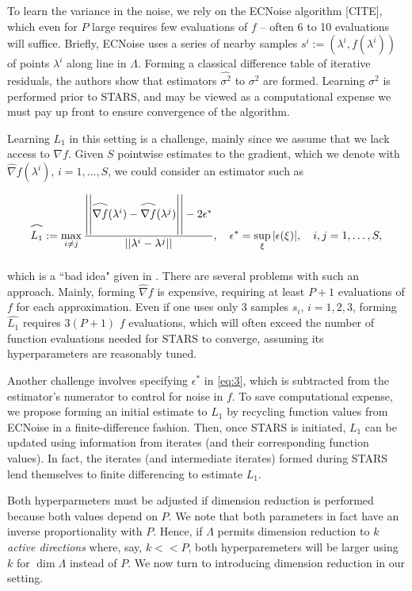 \documentclass{amsart}
\newcommand\reallywidehat[1]{\arraycolsep=0pt\relax%
\begin{array}{c}
\stretchto{
  \scaleto{
    \scalerel*[\widthof{\ensuremath{#1}}]{\kern-.5pt\bigwedge\kern-.5pt}
    {\rule[-\textheight/2]{1ex}{\textheight}} %
  }{\textheight} %
}{0.5ex}\\           %
#1\\                 %
\rule{-1ex}{0ex}
\end{array}
}
\begin{document}
To learn the variance in the noise, we rely on the ECNoise algorithm [CITE], which even for $P$ large requires few evaluations of $f$ -- often 6 to 10 evaluations will suffice. Briefly, ECNoise uses a series of nearby samples $s^i:=(\lambda^i,f(\lambda^i))$ of points $\lambda^i$ along line in $\Lambda$. Forming a classical difference table of iterative residuals, the authors show that estimators $\hat{\sigma^2}$ to $\sigma^2$ are formed. Learning $\sigma^2$ is performed prior to STARS, and may be viewed as a computational expense we must pay up front to ensure convergence of the algorithm.

Learning $L_1$ in this setting is a challenge, mainly since we assume that we lack access to $\nabla f$. Given $S$ pointwise estimates to the gradient, which we denote with $\hat{\nabla}f(\lambda^i)$, $i=1,\ldots, S$, we could consider an estimator such as



\begin{equation} \label{eq:3}
\reallywidehat{L_1}:= \max_{i \neq j} \frac{\left|\left|\reallywidehat{\nabla f}(\lambda^{i})-\reallywidehat{\nabla f}(\lambda^{j})\right|\right|-2\epsilon^*}{||\lambda^{i}-\lambda^{j}||}, \quad \epsilon^*=\sup_\xi |\epsilon(\xi)|, \quad i,j=1,\ldots, S,
\end{equation} 

\noindent which is a ``bad idea" given in \cite{Calliess}. There are several problems with such an approach. Mainly, forming $\hat{\nabla} f$ is expensive, requiring at least $P+1$ evaluations of $f$ for each approximation. Even if one uses only 3 samples $s_i$, $i=1,2,3$, forming $\hat{L_1}$ requires $3(P+1)$ $f$ evaluations, which will often exceed the number of function evaluations needed for STARS to converge, assuming its hyperparameters are reasonably tuned.

Another challenge involves specifying $\epsilon^*$ in \eqref{eq:3}, which is subtracted from the estimator's numerator to control for noise in $f$. To save computational expense, we propose forming an initial estimate to $L_1$ by recycling function values from ECNoise in a finite-difference fashion. Then, once STARS is initiated, $L_1$ can be updated using information from iterates (and their corresponding function values). In fact, the iterates (and intermediate iterates) formed during STARS lend themselves to finite differencing to estimate $L_1$.

Both hyperparmeters must be adjusted if dimension reduction is performed because both values depend on $P$. We note that both parameters in fact have an inverse proportionality with $P$. Hence, if $\Lambda$ permits dimension reduction to $k$ \textit{active directions} where, say, $k<<P$, both hyperparemeters will be larger using $k$ for $\dim \Lambda$ instead of $P.$ We now turn to introducing dimension reduction in our setting.
\end{document}
